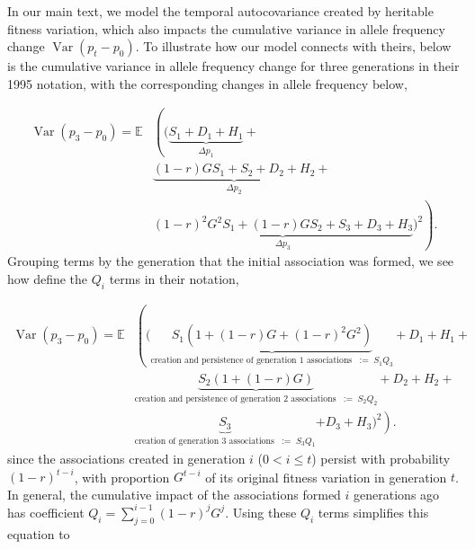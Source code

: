 \documentclass[11pt]{article}
\newcommand{\nnn}{\nonumber}
\newcommand{\E}{\mathbb{E}}
\DeclareMathOperator{\var}{Var}
\begin{document}
In our main text, we model the temporal autocovariance created by heritable
fitness variation, which also impacts the cumulative variance in allele
frequency change $\var(p_t - p_0)$. To illustrate how our model connects with
theirs, below is the cumulative variance in allele frequency change for three
generations in their 1995 notation, with the corresponding changes in allele
frequency below,

\begin{align}
  \var(p_3 - p_0) = \E & \left( \bigg( \underbrace{S_1 + D_1 + H_1}_{\Delta p_1} + \right. \nonumber \\
                             & \underbrace{ (1-r) G S_1 + S_2 + D_2 + H_2}_{\Delta p_2} + \nonumber \\
                             & \left.  \underbrace{ (1-r)^2 G^2 S_1 + (1-r) G S_2 + S_3 + D_3 + H_3}_{\Delta p_3} \bigg)^2 \right).
    \label{eq:sc-var4}
\end{align}
%
Grouping terms by the generation that the initial association was formed, we
see how \textcite{Santiago1995-hx} define the $Q_i$ terms in their notation,

\begin{align}
  \var(p_3 - p_0) = \E & \left( \bigg( \underbrace{S_1(1 + (1-r) G + (1-r)^2 G^2)}_{\text{creation and persistence of generation 1 associations} \;\; := \; S_1 Q_3} \right. +  D_1 + H_1+ \nonumber \\
                       & \underbrace{S_2(1 + (1-r) G)}_{\text{creation and persistence of generation 2 associations} \;\; := \; S_2 Q_2}+ D_2 + H_2 + \nonumber \\
                       &  \underbrace{S_3}_{\text{creation of generation 3 associations} \;\; := \; S_3 Q_1  }\left. + D_3 + H_3 \bigg)^2 \right). &
    \label{eq:scr-var2}
\end{align}
%
since the associations created in generation $i$ ($ 0 < i \le t$) persist with
probability $(1-r)^{t-i}$, with proportion $G^{t-i}$ of its original fitness
variation in generation $t$. In general, the cumulative impact of the
associations formed $i$ generations ago has coefficient $Q_i =
\sum_{j=0}^{i-1} (1-r)^j G^j$. Using these $Q_i$ terms simplifies this equation
to
\end{document}
